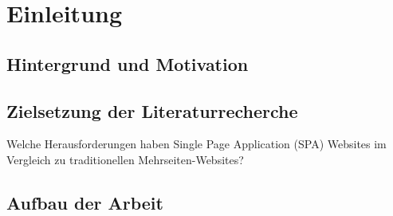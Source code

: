 
\section{Einleitung}


\subsection{Hintergrund und Motivation}

\subsection{Zielsetzung der Literaturrecherche}
Welche Herausforderungen haben Single Page Application (SPA) Websites im Vergleich zu traditionellen Mehrseiten-Websites?

\subsection{Aufbau der Arbeit}

